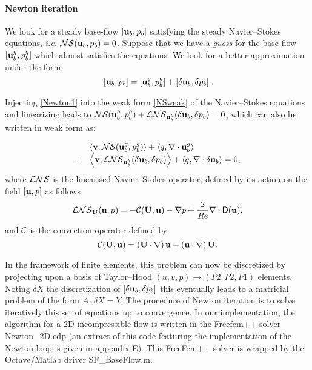 \documentclass[twocolumn,10pt]{asme2ej}
\newcommand{\be}[1]{ \begin{equation} \label{#1}}
\newcommand{\ee}{\end{equation}}
\newcommand{\bes}[1]{ \begin{equation} \label{#1}\begin{array}{rl}}
\newcommand{\ees}{\end{array}\end{equation}}
\begin{document}
\paragraph{Newton iteration}


We look for a steady base-flow $[{\bf u}_b,p_b]$ satisfying the steady Navier--Stokes equations, \textit{i.e.} 
${\cal NS} ({\bf u}_b,p_b) = 0$.
Suppose that we have a {\em guess}  for the base flow $[{\bf u}_b^g,p_b^g]$  which almost satisfies the equations. 
We look for a better approximation under the form
\be{Newton1}
[{\bf u}_b,p_b]  = [{\bf u}_b^g,p_b^g] + [\delta {\bf u}_b, \delta p_b].
\ee

Injecting \eqref{Newton1} into the weak form \eqref{NSweak} of the Navier--Stokes equations and linearizing leads to  
${\cal NS}  ({\bf u}_b^g,p_b^g) +  {\cal LNS} _{{\bf u}_b^g}(\delta {\bf u}_b,\delta p_b) = 0$, which can also be written in weak form as:

\bes{Newton2}
&\left< {\bf v}, {\cal NS} ({\bf u}_b^g,p_b^g)\right> + \left<q, \nabla \cdot {\bf u}_b^g\right>  
\\
+ &\left< { \bf v}, {\cal LNS} _{{\bf u}_b^g}( \delta {\bf u}_b,\delta p_b) \right> + \left<q, \nabla \cdot \delta{\bf u}_b\right> = 0,
\ees
where ${\cal LNS}$ is the linearised Navier--Stokes operator, defined by its action on the field $[{\bf u} , p]$ as follows 
\be{defNSL}
 {\cal LNS}_{{\bf U}}( {\bf u}, p) = - {\cal C}( {\bf U} , {\bf u}) -\nabla p
+\frac{2}{Re} \nabla  \cdot {\mathsf{D}}({\bf u}), %
 \ee
and ${\cal C}$ is the convection operator defined by 
\be{defC}
{\cal C}( {\bf U} , {\bf u}) = \left( {\bf U} \cdot \nabla \right) {\bf u} + \left( {\bf u} \cdot \nabla \right)  {\bf U}.
\ee

In the framework of finite elements, this problem can now be discretized by projecting upon a basis of Taylor--Hood $(u,v,p) \rightarrow (P2,P2,P1)$ elements. Noting $\delta X$ the discretization of $[\delta {\bf u}_b,\delta p_b]$ this eventually leads to a matricial problem of the form $A \cdot \delta X = Y$. The procedure of Newton iteration is to solve iteratively this set of equations up to convergence.
In our implementation, the algorithm for a 2D incompressible flow is written in the Freefem++ solver {\sf Newton\_2D.edp} (an extract of this code featuring the implementation of the Newton loop is given in appendix E). This FreeFem++ solver is wrapped by the Octave/Matlab driver {\sf SF\_BaseFlow.m}.
\end{document}
